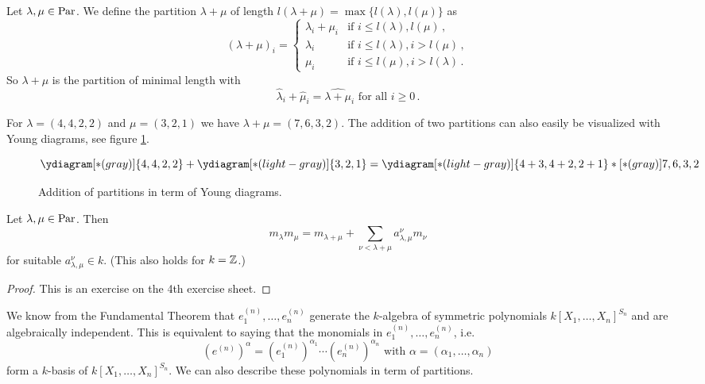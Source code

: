 \begin{definition}
  Let $\lambda, \mu \in \operatorname{Par}$.
  We define the partition $\lambda+\mu$ of length $l(\lambda+\mu) = \max\{ l(\lambda), l(\mu) \}$ as
  \[
      (\lambda+\mu)_i
    = \begin{cases}
        \lambda_i + \mu_i & \text{if } i \leq l(\lambda),l(\mu)       \,, \\
        \lambda_i         & \text{if } i \leq l(\lambda), i > l(\mu)  \,, \\
        \mu_i             & \text{if } i \leq l(\mu), i > l(\lambda)  \,.
      \end{cases}
  \]
  So $\lambda+\mu$ is the partition of minimal length with
  \[
      \hat{\lambda}_i + \hat{\mu}_i
    = \widehat{\lambda + \mu}_i
    \text{ for all }
    i \geq 0 \,.
  \]
\end{definition}


\begin{example}
  For $\lambda = (4,4,2,2)$ and $\mu = (3,2,1)$ we have $\lambda + \mu = (7,6,3,2)$.
  The addition of two partitions can also easily be visualized with Young diagrams, see figure \ref{figure: addition partition young diagrams}.
  \begin{figure}\centering
    \[
        \ydiagram[*(gray)]{4,4,2,2} + \ydiagram[*(light-gray)]{3,2,1}
      = \ydiagram[*(light-gray)] {4+3,4+2,2+1} *[*(gray)]{7,6,3,2}
    \]
    \caption{Addition of partitions in term of Young diagrams.}
    \label{figure: addition partition young diagrams}
  \end{figure}
\end{example}


\begin{lemma}
  Let $\lambda, \mu \in \operatorname{Par}$.
  Then
  \[
      m_{\lambda} m_{\mu}
    =   m_{\lambda + \mu}
      + \sum_{\nu < \lambda + \mu} a^\nu_{\lambda,\mu} m_\nu
  \]
  for suitable $a^\nu_{\lambda,\mu} \in k$.
  (This also holds for $k = \mathbb{Z}$.)
\end{lemma}
\begin{proof}
  This is an exercise on the 4th exercise sheet.
\end{proof}


We know from the Fundamental Theorem that $e^{(n)}_1, \dotsc, e^{(n)}_n$ generate the $k$-algebra of symmetric polynomials $k[X_1, \dotsc, X_n]^{S_n}$ and are algebraically independent. This is equivalent to saying that the monomials in $e^{(n)}_1, \dotsc, e^{(n)}_n$, i.e.\
\[
    \left( e^{(n)} \right)^\alpha
  = \left( e^{(n)}_1 \right)^{\alpha_1} \dotsm \left( e^{(n)}_n \right)^{\alpha_n}
  \text{ with }
  \alpha = (\alpha_1, \dotsc, \alpha_n)
\]
form a $k$-basis of $k[X_1, \dotsc, X_n]^{S_n}$.
We can also describe these polynomials in term of partitions.


